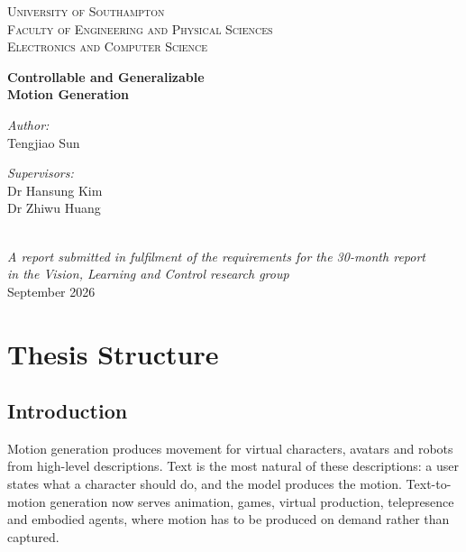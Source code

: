 \documentclass[11pt,a4paper]{report}
\begin{document}
\begin{titlepage}
\centering
\vspace*{1.5cm}
{\large\scshape University of Southampton}\\[1.2cm]
{\scshape Faculty of Engineering and Physical Sciences}\\
{\scshape Electronics and Computer Science}\\[2.5cm]
{\LARGE\bfseries Controllable and Generalizable\\[0.25cm]
Motion Generation\par}
\vspace{2.5cm}
\begin{minipage}{0.45\textwidth}
\begin{flushleft}\large
\emph{Author:}\\
Tengjiao Sun
\end{flushleft}
\end{minipage}
\begin{minipage}{0.45\textwidth}
\begin{flushright}\large
\emph{Supervisors:}\\
Dr Hansung Kim\\
Dr Zhiwu Huang
\end{flushright}
\end{minipage}\\[3cm]
{\itshape A report submitted in fulfilment of the requirements for the
30-month report\\ in the Vision, Learning and Control research group}\\[2cm]
{\large September 2026}
\vfill
\end{titlepage}

\chapter{Thesis Structure}

\section{Introduction}

Motion generation produces movement for virtual characters, avatars and robots
from high-level descriptions. Text is the most natural of these descriptions: a
user states what a character should do, and the model produces the motion.
Text-to-motion generation now serves animation, games, virtual production,
telepresence and embodied agents, where motion has to be produced on demand
rather than captured.
\end{document}
